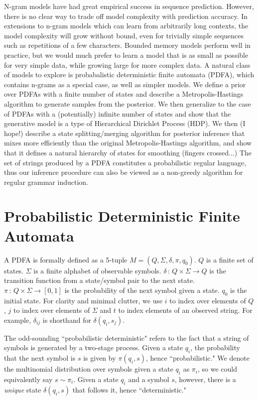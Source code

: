 \documentclass[11pt]{article}
\begin{document}
N-gram models have had great empirical success in sequence prediction.  However, there is no clear way to trade off model complexity with prediction accuracy.  In extensions to n-gram models which can learn from arbitrarily long contexts, the model complexity will grow without bound, even for trivially simple sequences such as repetitions of a few characters.  Bounded memory models perform well in practice, but we would much prefer to learn a model that is as small as possible for very simple data, while growing large for more complex data.  A natural class of models to explore is probabalistic deterministic finite automata (PDFA), which contains n-grams as a special case, as well as simpler models.  We define a prior over PDFAs with a finite number of states and describe a Metropolis-Hastings algorithm to generate samples from the posterior.  We then generalize to the case of PDFAs with a (potentially) infinite number of states and show that the generative model is a type of Hierarchical Dirichlet Process (HDP).  We then (I hope!) describe a state splitting/merging algorithm for posterior inference that mixes more efficiently than the original Metropolis-Hastings algorithm, and show that it defines a natural hierarchy of states for smoothing (fingers crossed...)  The set of strings produced by a PDFA constitutes a probabilistic regular language, thus our inference procedure can also be viewed as a non-greedy algorithm for regular grammar induction.

\section{Probabilistic Deterministic Finite Automata}
A PDFA is formally defined as a 5-tuple $M = (Q,\Sigma,\delta,\pi,q_0)$.  $Q$ is a finite set of states. $\Sigma$ is a finite alphabet of observable symbols. $\delta\,:\,Q\times\Sigma\rightarrow Q$ is the transition function from a state/symbol pair to the next state.  $\pi\,:\,Q\times\Sigma\rightarrow[0,1]$ is the probability of the next symbol given a state.  $q_0$ is the initial state.  For clarity and minimal clutter, we use $i$ to index over elements of $Q$, $j$ to index over elements of $\Sigma$ and $t$ to index elements of an observed string.  For example, $\delta_{ij}$ is shorthand for $\delta(q_i,s_j)$.

The odd-sounding ``probabilistic deterministic" refers to the fact that a string of symbols is generated by a two-stage process.  Given a state $q_i$, the probability that the next symbol is $s$ is given by $\pi(q_i,s)$, hence ``probabilistic."  We denote the multinomial distribution over symbols given a state $q_i$ as $\pi_i$, so we could equivalently say $s \sim \pi_i$.  Given a state $q_i$ and a symbol $s$, however, there is a {\it unique} state $\delta(q_i,s)$ that follows it, hence ``deterministic."  
\end{document}
